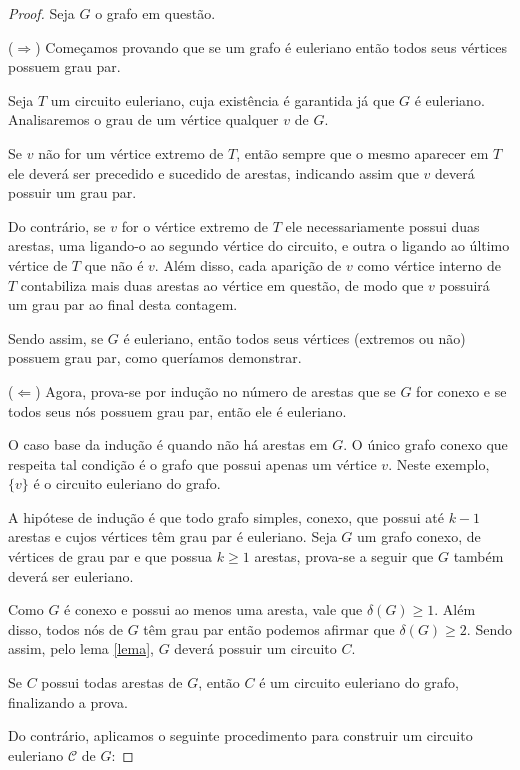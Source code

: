 \begin{proof}

Seja $G$ o grafo em questão.

($\Rightarrow$) Começamos provando que se um grafo é euleriano então todos seus vértices possuem grau par.

Seja $T$ um circuito euleriano, cuja existência é garantida já que $G$ é euleriano. Analisaremos o grau de um vértice qualquer $v$ de $G$.

Se $v$ não for um vértice extremo de $T$, então sempre que o mesmo aparecer em $T$ ele deverá ser precedido e sucedido de arestas, indicando assim que $v$ deverá possuir um grau par.

Do contrário, se $v$ for o vértice extremo de $T$ ele necessariamente possui duas arestas, uma ligando-o ao segundo vértice do circuito, e outra o ligando ao último vértice de $T$ que não é $v$. 
Além disso, cada aparição de $v$ como vértice interno de $T$ contabiliza mais duas arestas ao vértice em questão, de modo que $v$ possuirá um grau par ao final desta contagem.

Sendo assim, se $G$ é euleriano, então todos seus vértices (extremos ou não) possuem grau par, como queríamos demonstrar.

($\Leftarrow$) Agora, prova-se por indução no número de arestas que se $G$ for conexo e se todos seus nós possuem grau par, então ele é euleriano.

O caso base da indução é quando não há arestas em $G$. 
O único grafo conexo que respeita tal condição é o grafo que possui apenas um vértice $v$.
Neste exemplo, $\{v\}$ é o circuito euleriano do grafo.

A hipótese de indução é que todo grafo simples, conexo, que possui até $k-1$ arestas e cujos vértices têm grau par é euleriano. 
Seja $G$ um grafo conexo, de vértices de grau par e que possua $k \geq 1$ arestas, prova-se a seguir que $G$ também deverá ser euleriano.

Como $G$ é conexo e possui ao menos uma aresta, vale que $\delta(G) \geq 1$.
Além disso, todos nós de $G$ têm grau par então podemos afirmar que $\delta(G) \geq 2$. 
Sendo assim, pelo lema \ref{lema}, $G$ deverá possuir um circuito $C$.

Se $C$ possui todas arestas de $G$, então $C$ é um circuito euleriano do grafo, finalizando a prova.

Do contrário, aplicamos o seguinte procedimento para construir um circuito euleriano $\mathcal{C}$ de $G$:


\end{proof}
